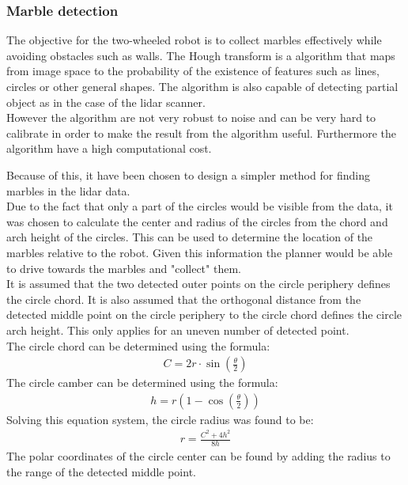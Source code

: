 \documentclass[../Head/Main.tex]{subfiles}
\begin{document}
\subsubsection{Marble detection}
\label{subsec:DesignMarbleDetection}
The objective for the two-wheeled robot is to collect marbles effectively while avoiding obstacles such as walls. 
The Hough transform is a algorithm that maps from image space to the probability of the existence of features such as lines, circles or other general shapes. The algorithm is also capable of detecting partial object as in the case of the lidar scanner. \\
However the algorithm are not very robust to noise and can be very hard to calibrate in order to make the result from the algorithm useful. Furthermore the algorithm have a high computational cost.\par 
Because of this, it have been chosen to design a simpler method for finding marbles in the lidar data.\\ 
Due to the fact that only a part of the circles would be visible from the data, it was chosen to calculate the center and radius of the circles from the chord and arch height of the circles. This can be used to determine the location of the marbles relative to the robot. Given this information the planner would be able to drive towards the marbles and "collect" them. \\
It is assumed that the two detected outer points on the circle periphery defines the circle chord. It is also assumed that the orthogonal distance from the detected middle point on the circle periphery to the circle chord defines the circle arch height. This only applies for an uneven number of detected point.\\
The circle chord can be determined using the formula:
\begin{align*}
	C = 2r\cdot\sin\left(\frac{\theta}{2}\right)
\end{align*}
The circle camber can be determined using the formula:
\begin{align*}
	h = r\left(1-\cos\left(\frac{\theta}{2}\right)\right)
\end{align*}
Solving this equation system, the circle radius was found to be:
\begin{align*}
	r = \frac{C^2+4h^2}{8h}
\end{align*}
The polar coordinates of the circle center can be found by adding the radius to the range of the detected middle point.

\end{document}
